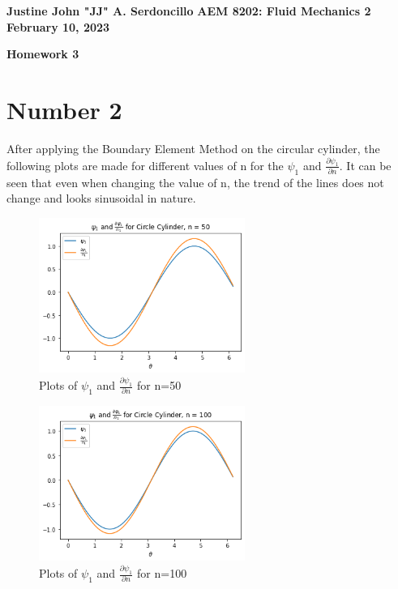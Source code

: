 \documentclass{article}
\begin{document}
	
	\noindent\textbf{Justine John "JJ" A. Serdoncillo}
	\hfill \textbf{AEM 8202: Fluid Mechanics 2} \\ \hfill \textbf{February 10, 2023}
	
	\begin{center}
		\Large{\textbf{Homework 3}}    
	\end{center}
	
	\section*{Number 2}
		After applying the Boundary Element Method on the circular cylinder, the following plots are made for different values of n for the $\psi_1$ and $\frac{\partial \psi_1}{\partial n}$. It can be seen that even when changing the value of n, the trend of the lines does not change and looks sinusoidal in nature.

		\begin{figure}[H]
			\centering
			\includegraphics[width=0.6\textwidth]{images/cl50.png}
			\caption{ Plots of $\psi_1$ and $\frac{\partial \psi_1}{\partial n}$ for n=50}
		\end{figure}
	
		\begin{figure}[H]
			\centering
			\includegraphics[width=0.6\textwidth]{images/cl100.png}
			\caption{ Plots of $\psi_1$ and $\frac{\partial \psi_1}{\partial n}$ for n=100}
		\end{figure}
	
\end{document}
